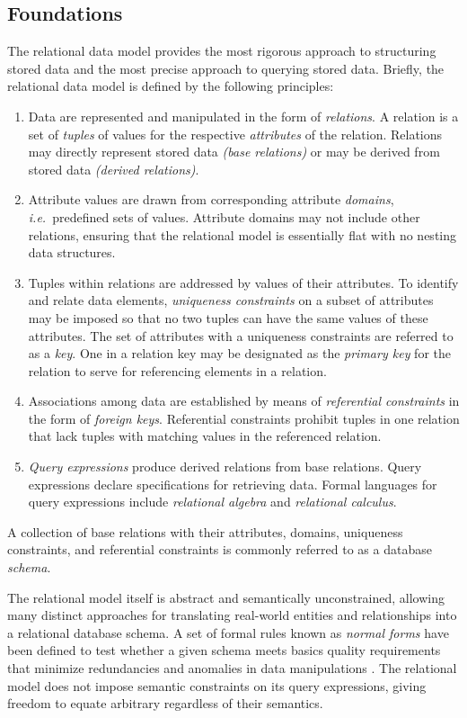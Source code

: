 \documentclass[letter,10pt]{article}
\begin{document}
\subsection{Foundations}
The relational data model \citep{codd_relational_1970} provides the most rigorous approach to structuring stored data and the most precise approach to querying stored data.  
Briefly, the relational data model is defined by the following principles:
\begin{enumerate}
\item Data are represented and manipulated in the form of \emph{relations}. 
A relation is a set of \emph{tuples} of values for the respective \emph{attributes} of the relation.
Relations may directly represent stored data \emph{(base relations)} or may be derived from stored data \emph{(derived relations)}.
\item Attribute values are drawn from corresponding attribute \emph{domains}, \emph{i.e.}\ predefined sets of values.
Attribute domains may not include other relations, ensuring that the relational model is essentially flat with no nesting data structures.
\item Tuples within relations are addressed by values of their attributes.
To identify and relate data elements, \emph{uniqueness constraints} on a subset of attributes may be imposed so that no two tuples can have the same values of these attributes.  The set of attributes with a uniqueness constraints are referred to as a \emph{key}. One in a relation key may be designated as the \emph{primary key} for the relation to serve for referencing elements in a relation.
\item Associations among data are established by means of \emph{referential constraints} in the form of \emph{foreign keys}. 
Referential constraints prohibit tuples in one relation that lack tuples with matching values in the referenced relation. 
\item \emph{Query expressions} produce derived relations from base relations.  Query expressions declare specifications for retrieving data.
Formal languages for query expressions include \emph{relational algebra} and \emph{relational calculus}.  
\end{enumerate}

A collection of base relations with their attributes, domains, uniqueness constraints, and referential constraints is commonly referred to as a database \emph{schema}.

The relational model itself is abstract and semantically unconstrained, allowing many distinct approaches for translating real-world entities and relationships into a relational database schema. 
A set of formal rules known as \emph{normal forms} have been defined to test whether a given schema meets basics quality requirements that minimize redundancies and anomalies in data manipulations \citep{kent-1983-simple}.
The relational model does not impose semantic constraints on its query expressions, giving freedom to equate arbitrary regardless of their semantics.
\end{document}
